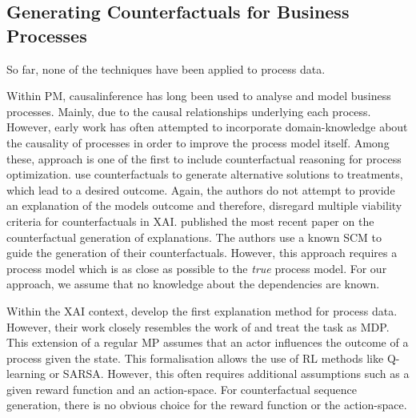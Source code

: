 \documentclass[./../../paper.tex]{subfiles}
\begin{document}
\subsection{Generating Counterfactuals for Business Processes}
So far, none of the techniques have been applied to process data.

Within \gls{PM}, \gls{causalinference} has long been used to analyse and model business processes. Mainly, due to the causal relationships underlying each process. However, early work has often attempted to incorporate domain-knowledge about the causality of processes in order to improve the process model itself\autocites{shook_assessmentusestructural_2004,baker_ClosingLoopEmpirical_2017,hompes_DiscoveringCausalFactors_2017,wang_CounterfactualDataAugmentedSequential_2021}.
Among these, \citeauthor{narendra_CounterfactualReasoningProcess_2019} approach is one of the first to include counterfactual reasoning for process optimization\autocite{narendra_CounterfactualReasoningProcess_2019}.
\citeauthor{oberst_CounterfactualOffPolicyEvaluation_2019} use counterfactuals to generate alternative solutions to treatments, which lead to a desired outcome\autocite{oberst_CounterfactualOffPolicyEvaluation_2019}.
Again, the authors do not attempt to provide an explanation of the models outcome and therefore, disregard multiple viability criteria for counterfactuals in \gls{XAI}. \citeauthor{qafari_CaseLevelCounterfactual_2021} published the most recent paper on the counterfactual generation of explanations\autocite{qafari_CaseLevelCounterfactual_2021}. The authors use a known \gls{SCM} to guide the generation of their counterfactuals. However, this approach requires a process model which is as close as possible to the \emph{true} process model. For our approach, we assume that no knowledge about the dependencies are known.

Within the \gls{XAI} context, \citeauthor{tsirtsis_CounterfactualExplanationsSequential_2021} develop the first explanation method for process data\autocite{tsirtsis_CounterfactualExplanationsSequential_2021}. However, their work closely resembles the work of \citeauthor{oberst_CounterfactualOffPolicyEvaluation_2019} and treat the task as \gls{MDP}\autocite{oberst_CounterfactualOffPolicyEvaluation_2019}. This extension of a regular \gls{MP} assumes that an actor influences the outcome of a process given the state. This formalisation allows the use of \gls{RL} methods like Q-learning or SARSA. However, this often requires additional assumptions such as a given reward function and an action-space. For counterfactual sequence generation, there is no obvious choice for the reward function or the action-space. 
\end{document}
